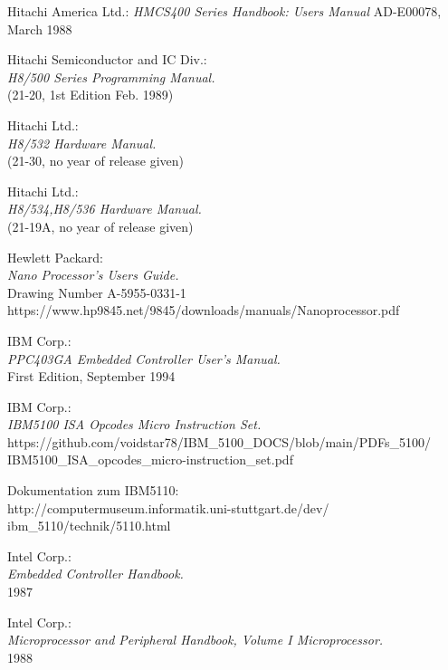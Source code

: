  Hitachi America Ltd.:
                 {\em HMCS400 Series Handbook: Users Manual\/}
                 AD-E00078, March 1988

 Hitachi Semiconductor and IC Div.: \\
                  {\em H8/500 Series Programming Manual.\/} \\
        	  (21-20, 1st Edition Feb. 1989)

 Hitachi Ltd.: \\
                    {\em H8/532 Hardware Manual.\/} \\
		    (21-30, no year of release given)

 Hitachi Ltd.: \\
                    {\em H8/534,H8/536 Hardware Manual.\/} \\
		    (21-19A, no year of release given)

 Hewlett Packard: \\
                 { \em Nano Processor's Users Guide.\/} \\
                 Drawing Number A-5955-0331-1 \\
                 https://www.hp9845.net/9845/downloads/manuals/Nanoprocessor.pdf

 IBM Corp.: \\
	         {\em PPC403GA Embedded Controller User's Manual.\/} \\
                 First Edition, September 1994

 IBM Corp.: \\
                 {\em IBM5100 ISA Opcodes Micro Instruction Set.\/} \\
                 https://github.com/voidstar78/IBM\_5100\_DOCS/blob/main/PDFs\_5100/ \\
                 IBM5100\_ISA\_opcodes\_micro-instruction\_set.pdf

 Dokumentation zum IBM5110: \\
          http://computermuseum.informatik.uni-stuttgart.de/dev/ \\
          ibm\_5110/technik/5110.html

 Intel Corp.: \\
                 {\em Embedded Controller Handbook.\/} \\
		 1987

 Intel Corp.: \\
                 {\em Microprocessor and Peripheral Handbook, Volume I
                 Microprocessor.\/} \\
                 1988

